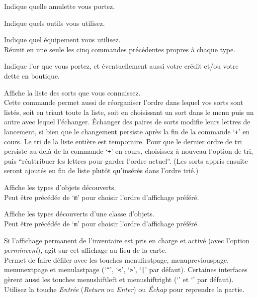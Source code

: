 \documentclass[titlepage]{article}
\begin{document}
\begin{description}[font=\mdseries\ttfamily]
Indique quelle amulette vous portez.
\item[(]
Indique quels outils vous utilisez.
\item[*]
Indique quel équipement vous utilisez.\\
Réunit en une seule les cinq commandes précédentes
propres à chaque type.
\item[\$]
Indique l'or que vous portez, et éventuellement aussi votre crédit et/ou votre dette en boutique.
\item[+]
Affiche la liste des sorts que vous connaissez.\\
Cette commande permet aussi de réorganiser
l'ordre dans lequel vos sorts sont listés, soit en triant toute la
liste, soit en choisissant un sort dans le menu puis un autre avec lequel
l'échanger.  Échanger des paires de sorts modifie leurs lettres de lancement,
si bien que le changement persiste après la fin de la commande `\texttt{+}' en cours.  Le tri
de la liste entière est temporaire.  Pour que le dernier ordre de tri persiste
au-delà de la commande `\texttt{+}' en cours, choisissez à nouveau l'option de tri, puis
``réattribuer les lettres pour garder l'ordre actuel''.  (Les sorts appris ensuite seront
ajoutés en fin de liste plutôt qu'insérés dans l'ordre
trié.)
\item[\textbackslash]
Affiche les types d'objets découverts.
\\
Peut être précédée de `\texttt{m}' pour choisir l'ordre d'affichage préféré.
\item[\textasciigrave]
Affiche les types découverts d'une classe d'objets.
\\
Peut être précédée de `\texttt{m}' pour choisir l'ordre d'affichage préféré.

\item[|]
Si l'affichage permanent de l'inventaire est pris en charge et activé (avec l'option
\textit{perm\textunderscore invent}), agit sur cet affichage au lieu de la carte.
\\
Permet de faire défiler avec les touches
menu\textunderscore first\textunderscore page, menu\textunderscore previous\textunderscore page,
menu\textunderscore next\textunderscore page et menu\textunderscore last\textunderscore page
(`\texttt{\textasciicircum}', `\texttt{<}', `\texttt{>}', `\texttt{|}' par défaut).
Certaines interfaces gèrent aussi les touches menu\textunderscore shift\textunderscore left et menu\textunderscore shift\textunderscore right
(`\texttt{\textbraceleft}' et `\texttt{\textbraceright}' par défaut).
Utilisez la touche \textit{Entrée} (\textit{Return} ou \textit{Enter}) ou \textit{Échap} pour
reprendre la partie.


\end{description}
\end{document}
